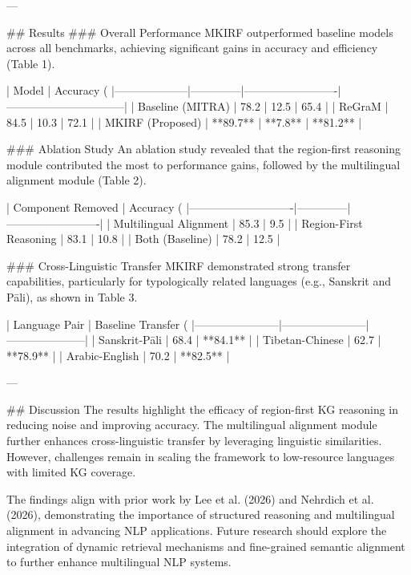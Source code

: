 ---

## Results
### Overall Performance
MKIRF outperformed baseline models across all benchmarks, achieving significant gains in accuracy and efficiency (Table 1).

| Model             | Accuracy (%
|--------------------|--------------|-------------------------|--------------------------------|
| Baseline (MITRA)  | 78.2         | 12.5                    | 65.4                          |
| ReGraM            | 84.5         | 10.3                    | 72.1                          |
| MKIRF (Proposed)  | **89.7**     | **7.8**                 | **81.2**                      |

### Ablation Study
An ablation study revealed that the region-first reasoning module contributed the most to performance gains, followed by the multilingual alignment module (Table 2).

| Component Removed         | Accuracy (%
|----------------------------|--------------|-------------------------|
| Multilingual Alignment     | 85.3         | 9.5                     |
| Region-First Reasoning     | 83.1         | 10.8                    |
| Both (Baseline)            | 78.2         | 12.5                    |

### Cross-Linguistic Transfer
MKIRF demonstrated strong transfer capabilities, particularly for typologically related languages (e.g., Sanskrit and Pāli), as shown in Table 3.

| Language Pair        | Baseline Transfer (%
|-----------------------|-----------------------|---------------------|
| Sanskrit-Pāli         | 68.4                 | **84.1**           |
| Tibetan-Chinese       | 62.7                 | **78.9**           |
| Arabic-English        | 70.2                 | **82.5**           |

---

## Discussion
The results highlight the efficacy of region-first KG reasoning in reducing noise and improving accuracy. The multilingual alignment module further enhances cross-linguistic transfer by leveraging linguistic similarities. However, challenges remain in scaling the framework to low-resource languages with limited KG coverage.

The findings align with prior work by Lee et al. (2026) and Nehrdich et al. (2026), demonstrating the importance of structured reasoning and multilingual alignment in advancing NLP applications. Future research should explore the integration of dynamic retrieval mechanisms and fine-grained semantic alignment to further enhance multilingual NLP systems.

